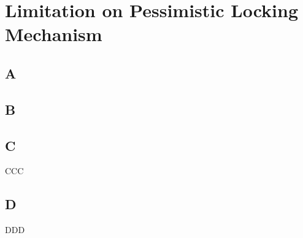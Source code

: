 
%
%


\chapter{Limitation on Pessimistic Locking Mechanism}
\label{ch:Consistency}

%



\section{A}





\section{B}


\section{C}

CCC


\section{D}

DDD



